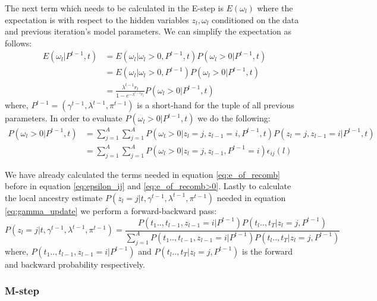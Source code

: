 The next term which needs to be calculated in the E-step is $E(\omega_l)$ where the expectation is with respect to the hidden variables $z_l, \omega_l$ conditioned on the data and previous iteration's model parameters. We can simplify the expectation as follows:
\begin{align}
    E(\omega_l \vert P^{t-1}, t) &= E(\omega_l \vert \omega_l > 0, P^{t-1}, t) P( \omega_l > 0 \vert P^{t-1}, t) \nonumber \\
    &= E(\omega_l \vert \omega_l > 0, P^{t-1}) P( \omega_l > 0 \vert P^{t-1}, t) \nonumber \\
    &= \frac{\lambda^{t-1}r_l}{1 - e^{-\lambda^{t-1}r_l}} P( \omega_l > 0 \vert P^{t-1}, t)
\label{eq:estep_121}
\end{align}
where, $P^{t-1} = (\gamma^{t-1}, \lambda^{t-1}, \pi^{t-1})$ is a short-hand for the tuple of all previous parameters. In order to evaluate $ P( \omega_l > 0 \vert P^{t-1}, t)$ we do the following: 
\begin{align}
  P( \omega_l > 0 \vert P^{t-1}, t) &= \sum\limits_{j=1}^{A}\sum\limits_{j=1}^{A}  P( \omega_l > 0 \vert z_l = j, z_{l-1} = i, P^{t-1}, t) P(z_l = j, z_{l-1} = i \vert P^{t-1}, t) \nonumber \\
  &= \sum\limits_{j=1}^{A}\sum\limits_{j=1}^{A}  P( \omega_l > 0 \vert z_l = j, z_{l-1},  P^{t-1} = i) \epsilon_{ij}(l)
\label{eq:e_of_recomb}
\end{align}

We have already calculated the terms needed in equation \ref{eq:e_of_recomb} before in equation \ref{eq:epsilon_ij} and \ref{eq:e_of_recomb>0}. Lastly to calculate the local ancestry estimate $P(z_l = j | t, \gamma^{t-1}, \lambda^{t-1}, \pi^{t-1})$ needed in equation \ref{eq:gamma_update} we perform a forward-backward pass:
\begin{equation}
    P(z_l = j | t, \gamma^{t-1}, \lambda^{t-1}, \pi^{t-1}) = \frac{P(t_1 .., t_{l-1}, z_{l-1}=i \vert P^{t-1})P(t_{l} .., t_T \vert z_l=j, P^{t-1})}{\sum\limits_{j=1}^{A}P(t_1 .., t_{l-1}, z_{l-1}=i \vert P^{t-1})P(t_{l} .., t_T \vert z_l=j, P^{t-1})}
\label{eq:hmm_forward_backward}
\end{equation}
where, $P(t_1 .., t_{l-1}, z_{l-1}=i \vert P^{t-1})$ and $P(t_{l} .., t_T \vert z_l=j, P^{t-1})$ is the forward and backward probability respectively. 

\subsubsection{M-step}

